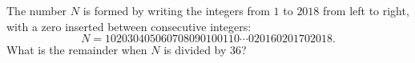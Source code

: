 The number $N$ is formed by writing the integers from $1$ to $2018$ from left to right, with a zero inserted between consecutive integers:
\[
N=102030405060708090100110\cdots020160201702018 .
\]
What is the remainder when $N$ is divided by $36$?
